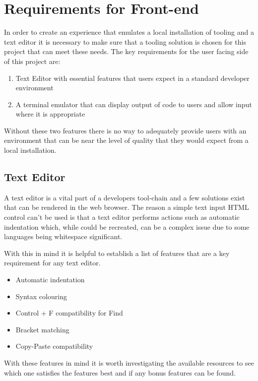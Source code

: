 \section{Requirements for Front-end} \label{solapp-front-end}

In order to create an experience that emulates a local installation of tooling and a text editor it is necessary to make sure that a tooling solution is chosen for this project that can meet these needs. The key requirements for the user facing side of this project are:

\begin{enumerate}
  \item Text Editor with essential features that users expect in a standard developer environment
  \item A terminal emulator that can display output of code to users and allow input where it is appropriate
\end{enumerate}

Without these two features there is no way to adequately provide users with an environment that can be near the level of quality that they would expect from a local installation.

\subsection{Text Editor}

A text editor is a vital part of a developers tool-chain and a few solutions exist that can be rendered in the web browser. The reason a simple text input HTML control can't be used is that a text editor performs actions such as automatic indentation which, while could be recreated, can be a complex issue due to some languages being whitespace significant.

With this in mind it is helpful to establish a list of features that are a key requirement for any text editor.

\begin{itemize}
  \item Automatic indentation
  \item Syntax colouring
  \item Control + F compatibility for Find
  \item Bracket matching
  \item Copy-Paste compatibility
\end{itemize}

With these features in mind it is worth investigating the available resources to see which one satisfies the features best and if any bonus features can be found.

